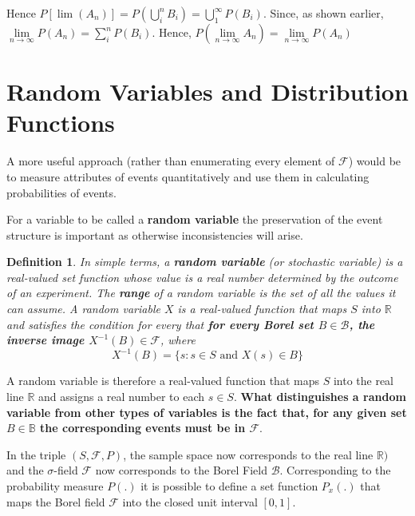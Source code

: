 \documentclass{article}
\newtheorem{definition}{Definition}[section]
\begin{document}
Hence \(P[\lim(A_n)]= P(\bigcup_{i}^{n} B_i) = \bigcup_{1}^{\infty} P(B_i)\). Since, as shown earlier, \( \lim\limits_{n \rightarrow \infty} P(A_n) = \sum_{i}^{n} P(B_i) \). Hence, \(P(\lim\limits_{n \rightarrow \infty} A_n)= \lim\limits_{n \rightarrow \infty} P(A_n)\)

\section{Random Variables and Distribution Functions}

A more useful approach (rather than enumerating every element of $\mathcal{F}$) would be to measure attributes of events quantitatively and use them in calculating probabilities of events. 

For a variable to be called a \textbf{random variable} the preservation of the event structure is important as otherwise inconsistencies will arise.

\begin{definition}
    In simple terms, a \textbf{random variable} (or stochastic variable) is a real-valued set function whose value is a real number determined by the outcome of an experiment. The \textbf{range} of a random variable is the set of all the values it can assume. A random variable \(X\) is a real-valued function that maps \(S\) into $\mathbb{R}$ and satisfies the condition for every that \textbf{for every Borel set \(B \in \mathcal{B}\), the inverse image \(X^{-1}(B) \in \mathcal{F}\)}, where
    \begin{equation*}
        X^{-1}(B)= \{s:s \in S \text{ and } X(s) \in B\}
    \end{equation*}
\end{definition}

A random variable is therefore a real-valued function that maps \(S\) into the real line \(\mathbb{R}\) and assigns a real number to each \(s \in S\). \textbf{What distinguishes a random variable from other types of variables is the fact that, for any given set \(B \in \mathbb{B}\) the corresponding events must be in \(\mathcal{F}\)}.

In the triple \((S, \mathcal{F}, P)\), the sample space now corresponds to the real line \(\mathbb{R})\) and the $\sigma$-field $\mathcal{F}$ now corresponds to the Borel Field \(\mathcal{B}\). Corresponding to the probability measure \(P(.)\) it is possible to define a set function \(P_x(.)\) that maps the Borel field \(\mathcal{F}\) into the closed unit interval \([0,1]\).
\end{document}
